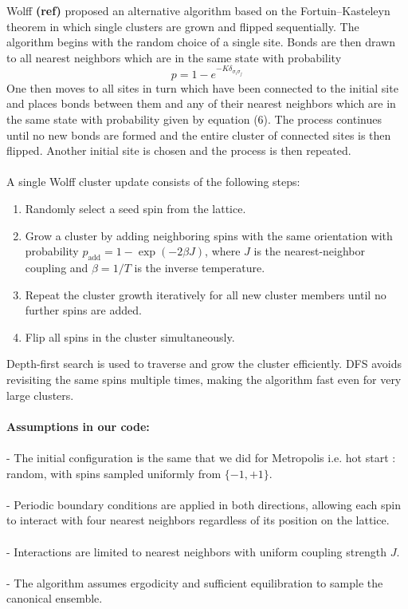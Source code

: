 \documentclass{article}
\begin{document}
Wolff \textbf{(ref)} proposed an alternative algorithm based
on the Fortuin–Kasteleyn theorem in which single clusters are grown and
flipped sequentially. The algorithm begins with the random choice of
a single site. Bonds are then drawn to all nearest neighbors which are in the
same state with probability 
\begin{equation}
p = 1-e^{-K\delta_{\sigma_i \sigma_j}}
\end{equation}
One then moves to all sites in turn which have been connected to the initial
site and places bonds between them and any of their nearest neighbors which
are in the same state with probability given by equation (6). The process
continues until no new bonds are formed and the entire cluster of connected
sites is then flipped. Another initial site is chosen and the process is then
repeated.
\\
\\
A single Wolff cluster update consists of the following steps:
    \begin{enumerate}
        \item Randomly select a seed spin from the lattice.
        \item Grow a cluster by adding neighboring spins with the same orientation with probability $p_{\text{add}} = 1 - \exp(-2 \beta J)$, where $J$ is the nearest-neighbor coupling and $\beta = 1/T$ is the inverse temperature.
        \item Repeat the cluster growth iteratively for all new cluster members until no further spins are added.
        \item Flip all spins in the cluster simultaneously.
    \end{enumerate}
Depth-first search is used to traverse and grow the cluster efficiently. DFS avoids revisiting the same spins multiple times, making the algorithm fast even for very large clusters.
\\
\\
\textbf{Assumptions in our code:} \\
\\
- The initial configuration is the same that we did for Metropolis i.e. hot start : random, with spins sampled uniformly from $\{-1, +1\}$.\\
\\
- Periodic boundary conditions are applied in both directions, allowing each spin to interact with four nearest neighbors regardless of its position on the lattice.\\
\\
- Interactions are limited to nearest neighbors with uniform coupling strength $J$.\\
\\
- The algorithm assumes ergodicity and sufficient equilibration to sample the canonical ensemble.\\
\end{document}
